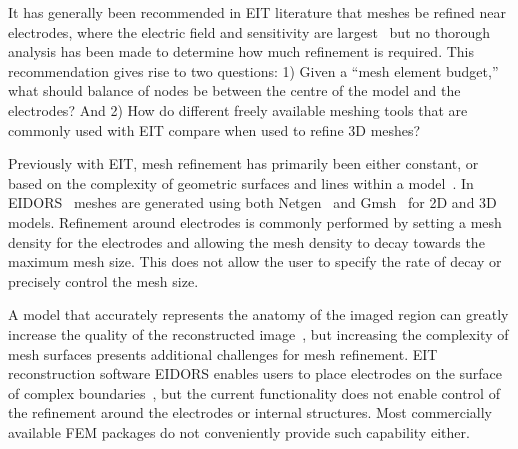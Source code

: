 

It has generally been recommended in EIT literature 
that meshes be refined near electrodes, where the electric 
field and sensitivity are largest~\parencite{adler_electrical_2017} 
but no thorough analysis has been made to determine how much 
refinement is required. 
This recommendation gives rise to two questions: 
1) Given a ``mesh element budget,'' what should
balance of nodes be between the centre of the model and the electrodes? And 
2) How do different freely available meshing tools that are
commonly used with EIT compare when used to refine 3D meshes?

Previously with EIT, mesh refinement has primarily been either 
constant, or based on 
the complexity of geometric surfaces and lines within a model~\parencite{grychtol_fem_2013}.  
In EIDORS~\parencite{adler_uses_2006} meshes are generated using both 
Netgen~\parencite{schoberl_netgen_1997} and Gmsh~\parencite{geuzaine_gmsh_2009} 
for 2D and 3D models. 
Refinement around electrodes is commonly performed by 
setting a mesh density for the electrodes and allowing the mesh density to 
decay towards the maximum mesh size. This does not allow the user to specify 
the rate of decay or precisely control the mesh size.   

A model that accurately represents the anatomy of the imaged region 
can greatly increase the quality of the reconstructed image~\parencite{grychtol_impact_2012},
but increasing the complexity of mesh surfaces presents additional challenges for
mesh refinement.  EIT reconstruction software EIDORS enables users to place electrodes on the surface of complex 
boundaries~\parencite{grychtol_fem_2013}, but the current functionality does not  
enable control of the refinement around the electrodes or internal 
structures.
Most commercially available FEM packages
do not conveniently provide such capability either.

